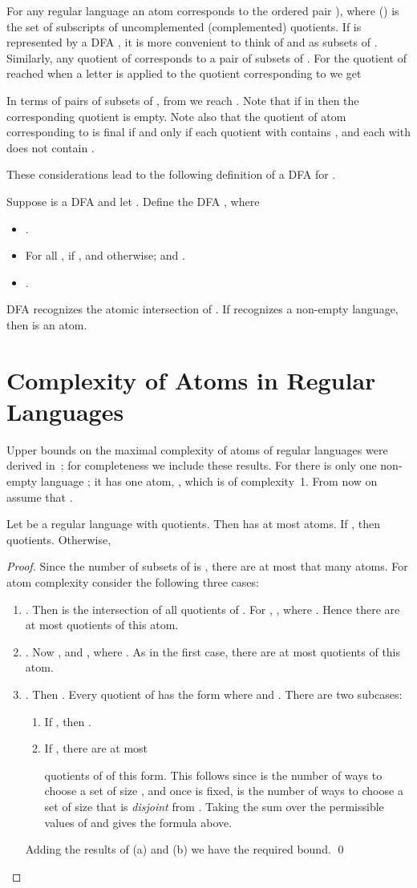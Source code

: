 \documentclass{llncs}
\newcommand{\bi}{\begin{itemize}}
\newcommand{\ei}{\end{itemize}}
\newcommand{\be}{\begin{enumerate}}
\newcommand{\ee}{\end{enumerate}}
\begin{document}
For any regular language  an atom  corresponds to the ordered pair ), where  () is the set of subscripts of uncomplemented (complemented) quotients. If  is represented by a DFA , it is more convenient to think of  and  as subsets of .
Similarly, any quotient of  corresponds to a pair  of subsets of . 
For the quotient of  reached when a letter  is applied to the quotient corresponding to  we get

In terms of pairs of subsets of , from  we reach . 
Note that if  in  then the corresponding quotient is empty.
Note also that the quotient of atom  corresponding to  is final if and only if
each quotient  with  contains , and each  with  does not contain .

These considerations lead to the following definition of a DFA for .
\begin{definition}
Suppose  is a DFA and let .
Define the DFA , where
\bi
\item
.
\item
For all ,  if , and  otherwise; and .
\item
. 
\ei
\end{definition}
DFA  recognizes the atomic intersection  of . If  recognizes a non-empty language, 
then  is an atom. 

\section{Complexity of Atoms in Regular Languages}

Upper bounds on the maximal complexity of atoms of regular languages were derived in~\cite{BrTa13}; for completeness we include these results.
For  there is only one non-empty language ; it has one atom, , which is of complexity~1. From now on assume that .

\begin{proposition}
\label{prop:reg}
Let  be a regular language with  quotients. Then  has at most  atoms.
If , then  quotients. Otherwise,

\end{proposition}
\begin{proof}
Since the number of subsets  of   is , there are at most that many atoms.
For atom complexity consider the following three cases:
\be
\item
.
Then   is the intersection of all quotients of . 
For ,  , where . 
Hence there are at most  quotients of this atom.
\item
. 
 Now , and
, where 
.
As in the first case, there are at most   quotients of this atom.
\item
. Then .
Every quotient of  has the form  where  and .
There are two subcases:
	\be
	\item
	If , then .
	\item
	If , there are at most 
	
	quotients of  of this form. This follows since  is the number of ways to choose a set  of size , and once  is fixed,  is the number of ways to choose a set  of size  that is \emph{disjoint} from . Taking the sum over the permissible values of  and  gives the formula above.
	\ee
Adding the results of (a) and (b)  we have the required bound. \qed
\ee
\end{proof}
\end{document}
